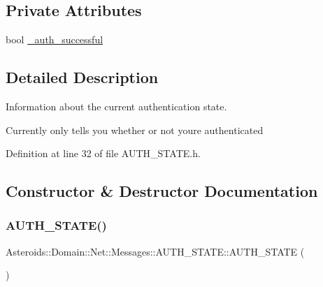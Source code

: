 \subsection*{Private Attributes}
\begin{DoxyCompactItemize}
\item 
bool \hyperlink{classAsteroids_1_1Domain_1_1Net_1_1Messages_1_1AUTH__STATE_a727148b2b2248fa4160982e6c15b96d7}{\+\_\+auth\+\_\+successful}
\end{DoxyCompactItemize}


\subsection{Detailed Description}
Information about the current authentication state. 

Currently only tells you whether or not you\textquotesingle{}re authenticated 

Definition at line 32 of file A\+U\+T\+H\+\_\+\+S\+T\+A\+T\+E.\+h.



\subsection{Constructor \& Destructor Documentation}
\mbox{\label{classAsteroids_1_1Domain_1_1Net_1_1Messages_1_1AUTH__STATE_a6d14693ee76c4fc9940ab2d85a24af5f}} 
\subsubsection{\texorpdfstring{A\+U\+T\+H\+\_\+\+S\+T\+A\+T\+E()}{AUTH\_STATE()}}
{\footnotesize\ttfamily Asteroids\+::\+Domain\+::\+Net\+::\+Messages\+::\+A\+U\+T\+H\+\_\+\+S\+T\+A\+T\+E\+::\+A\+U\+T\+H\+\_\+\+S\+T\+A\+TE (\begin{DoxyParamCaption}{ }\end{DoxyParamCaption})}



